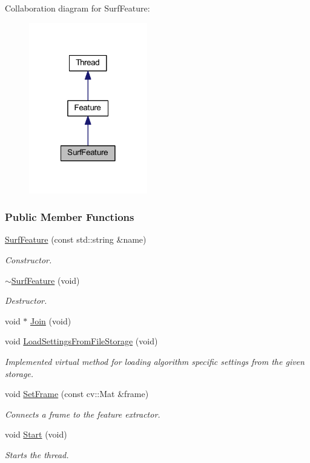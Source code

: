 Collaboration diagram for Surf\-Feature\-:
\nopagebreak
\begin{figure}[H]
\begin{center}
\leavevmode
\includegraphics[width=146pt]{class_surf_feature__coll__graph}
\end{center}
\end{figure}
\subsubsection*{Public Member Functions}
\begin{DoxyCompactItemize}
\item 
\hyperlink{group___feature_extractor_a7871e722b6277c3111f256b89240c192}{Surf\-Feature} (const std\-::string \&name)
\begin{DoxyCompactList}\small\item\em Constructor. \end{DoxyCompactList}\item 
\hyperlink{group___feature_extractor_a9dac0fead0f72630852c04aa0af5213f}{$\sim$\-Surf\-Feature} (void)
\begin{DoxyCompactList}\small\item\em Destructor. \end{DoxyCompactList}\item 
void $\ast$ \hyperlink{group___core_a8f33f7750321d5df9188033e7e3e300d}{Join} (void)
\item 
void \hyperlink{group___feature_extractor_a3717dc5d5cffd77f4f31c5ac81cd391a}{Load\-Settings\-From\-File\-Storage} (void)
\begin{DoxyCompactList}\small\item\em Implemented virtual method for loading algorithm specific settings from the given storage. \end{DoxyCompactList}\item 
void \hyperlink{group___feature_extractor_af261b9c5cac5ff1fb628317c7009c845}{Set\-Frame} (const cv\-::\-Mat \&frame)
\begin{DoxyCompactList}\small\item\em Connects a frame to the feature extractor. \end{DoxyCompactList}\item 
void \hyperlink{group___core_a2b42f82341afd2747ea093b6ac8b91cb}{Start} (void)
\begin{DoxyCompactList}\small\item\em Starts the thread. \end{DoxyCompactList}\end{DoxyCompactItemize}
